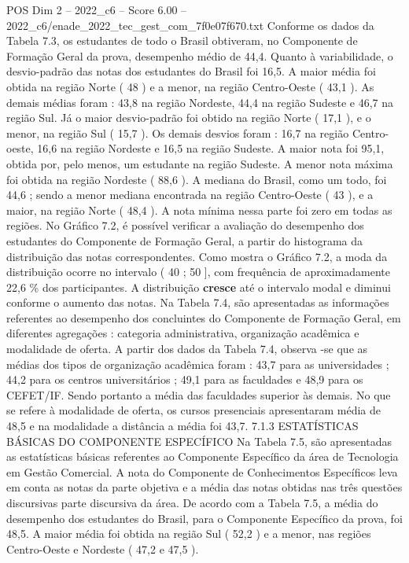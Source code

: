 \begin{textsample}{POS Dim 2 – 2022\_c6 – Score 6.00 – 2022\_c6/enade\_2022\_tec\_gest\_com\_7f0e07f670.txt}
Conforme os dados da Tabela 7.3, os estudantes de todo o Brasil obtiveram, no Componente de Formação Geral da prova, desempenho médio de 44,4.
Quanto à variabilidade, o desvio-padrão das notas dos estudantes do Brasil foi 16,5.
A maior média foi obtida na região Norte ( 48 ) e a menor, na região Centro-Oeste ( 43,1 ).
As demais médias foram : 43,8 na região Nordeste, 44,4 na região Sudeste e 46,7 na região Sul.
Já o maior desvio-padrão foi obtido na região Norte ( 17,1 ), e o menor, na região Sul ( 15,7 ).
Os demais desvios foram : 16,7 na região Centro-oeste, 16,6 na região Nordeste e 16,5 na região Sudeste.
A maior nota foi 95,1, obtida por, pelo menos, um estudante na região Sudeste.
A menor nota máxima foi obtida na região Nordeste ( 88,6 ).
A mediana do Brasil, como um todo, foi 44,6 ; sendo a menor mediana encontrada na região Centro-Oeste ( 43 ), e a maior, na região Norte ( 48,4 ).
A nota mínima nessa parte foi zero em todas as regiões.
No Gráfico 7.2, é possível verificar a avaliação do desempenho dos estudantes do Componente de Formação Geral, a partir do histograma da distribuição das notas correspondentes.
Como mostra o Gráfico 7.2, a moda da distribuição ocorre no intervalo ( 40 ; 50 ], com frequência de aproximadamente 22,6 \% dos participantes.
A distribuição \textbf{cresce} até o intervalo modal e diminui conforme o aumento das notas.
Na Tabela 7.4, são apresentadas as informações referentes ao desempenho dos concluintes do Componente de Formação Geral, em diferentes agregações : categoria administrativa, organização acadêmica e modalidade de oferta.
A partir dos dados da Tabela 7.4, observa -se que as médias dos tipos de organização acadêmica foram : 43,7 para as universidades ; 44,2 para os centros universitários ; 49,1 para as faculdades e 48,9 para os CEFET/IF.
Sendo portanto a média das faculdades superior às demais.
No que se refere à modalidade de oferta, os cursos presenciais apresentaram média de 48,5 e na modalidade a distância a média foi 43,7. 7.1.3 ESTATÍSTICAS BÁSICAS DO COMPONENTE ESPECÍFICO Na Tabela 7.5, são apresentadas as estatísticas básicas referentes ao Componente Específico da área de Tecnologia em Gestão Comercial.
A nota do Componente de Conhecimentos Específicos leva em conta as notas da parte objetiva e a média das notas obtidas nas três questões discursivas parte discursiva da área.
De acordo com a Tabela 7.5, a média do desempenho dos estudantes do Brasil, para o Componente Específico da prova, foi 48,5.
A maior média foi obtida na região Sul ( 52,2 ) e a menor, nas regiões Centro-Oeste e Nordeste ( 47,2 e 47,5 ).

\end{textsample}
